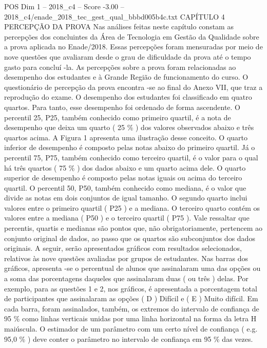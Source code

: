 \begin{textsample}{POS Dim 1 – 2018\_c4 – Score -3.00 – 2018\_c4/enade\_2018\_tec\_gest\_qual\_bbbd005b4c.txt}  \label{ex:f1_pos_305}
CAPÍTULO 4 PERCEPÇÃO DA PROVA Nas análises feitas neste capítulo constam as percepções dos concluintes da Área de Tecnologia em Gestão da Qualidade sobre a prova aplicada no Enade/2018.
Essas percepções foram mensuradas por meio de nove questões que avaliaram desde o grau de dificuldade da prova até o tempo gasto para concluí -la.
As percepções sobre a prova foram relacionadas ao desempenho dos estudantes e à Grande Região de funcionamento do curso.
O questionário de percepção da prova encontra -se ao final do Anexo VII, que traz a reprodução do exame.
O desempenho dos estudantes foi classificado em quatro quartos.
Para tanto, esse desempenho foi ordenado de forma ascendente.
O percentil 25, P25, também conhecido como primeiro quartil, é a nota de desempenho que deixa um quarto ( 25 \% ) dos valores observados abaixo e três quartos acima.
A Figura 1 apresenta uma ilustração desse conceito.
O quarto inferior de desempenho é composto pelas notas abaixo do primeiro quartil.
Já o percentil 75, P75, também conhecido como terceiro quartil, é o valor para o qual há três quartos ( 75 \% ) dos dados abaixo e um quarto acima dele.
O quarto superior de desempenho é composto pelas notas iguais ou acima do terceiro quartil.
O percentil 50, P50, também conhecido como mediana, é o valor que divide as notas em dois conjuntos de igual tamanho.
O segundo quarto inclui valores entre o primeiro quartil ( P25 ) e a mediana.
O terceiro quarto contém os valores entre a mediana ( P50 ) e o terceiro quartil ( P75 ).
Vale ressaltar que percentis, quartis e medianas são pontos que, não obrigatoriamente, pertencem ao conjunto original de dados, ao passo que os quartos são subconjuntos dos dados originais.
A seguir, serão apresentados gráficos com resultados selecionados, relativos às nove questões avaliadas por grupos de estudantes.
Nas barras dos gráficos, apresenta -se o percentual de alunos que assinalaram uma das opções ou a soma das porcentagens daqueles que assinalaram duas ( ou três ) delas.
Por exemplo, para as questões 1 e 2, nos gráficos, é apresentada a porcentagem total de participantes que assinalaram as opções ( D ) Difícil e ( E ) Muito difícil.
Em cada barra, foram assinalados, também, os extremos do intervalo de confiança de 95 \% como linhas verticais unidas por uma linha horizontal na forma da letra H maiúscula.
O estimador de um parâmetro com um certo nível de confiança ( e.g. 95,0 \% ) deve conter o parâmetro no intervalo de confiança em 95 \% das vezes.

\end{textsample}
